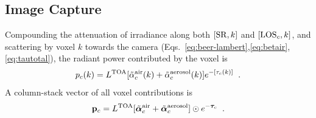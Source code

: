 \documentclass[10pt,twocolumn,letterpaper]{article}
\newcommand{\vect}[1]{\bm{#1}}
\begin{document}
\subsection{Image Capture}
\label{sec:captured-image}

Compounding the attenuation of irradiance along both $[{\rm SR},k]$ and $[{\rm LOS}_c,k]$, and scattering
by voxel $k$ towards the camera (Eqs.~\ref{eq:beer-lambert},\ref{eq:betair},\ref{eq:tautotal}), the radiant power contributed by the voxel is
\begin{equation}
  p_c(k)= L^{\rm TOA}
          [\tilde{\alpha}^{\rm air}_c(k) + \tilde{\alpha}^{\rm aerosol}_c(k)]
          e^{-[\tau_c(k)]}
  \;\;.
  \label{eq:ick}
\end{equation}
A column-stack vector of all voxel contributions is
\begin{equation}
 {\bf p}_c= L^{\rm TOA}
          [\tilde{\vect{\alpha}}^{\rm air}_c + \tilde{\vect{\alpha}}^{\rm aerosol}_c]
           \odot e^{-\vect{\tau}_c}
  \;\;.
  \label{eq:pc}
\end{equation}
\end{document}
